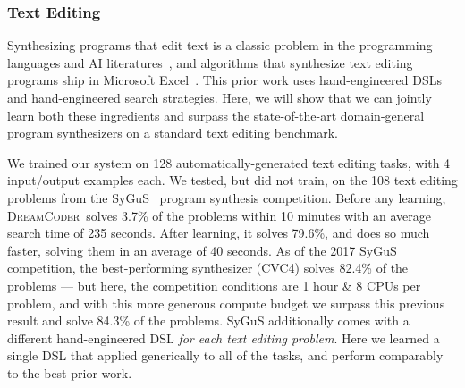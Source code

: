 \documentclass{article}
\newcommand{\system}{\textsc{DreamCoder}~}
\newcommand{\code}[1]{{\footnotesize\texttt{#1}}}
\newcommand{\probability}{\mathds{P}} %
\begin{document}
\subsubsection{Text Editing}\label{textSection}
Synthesizing programs that edit text is a classic problem in the
programming languages and AI literatures~\cite{lau2001programming},
and algorithms that synthesize text editing programs ship in Microsoft
Excel~\cite{gulwani2011automatin}.  This prior work uses
hand-engineered DSLs and hand-engineered search strategies.  Here, we
will show that we can jointly learn both these ingredients and surpass
the state-of-the-art domain-general program synthesizers on a standard
text editing benchmark.


We trained our system on 128 automatically-generated text editing tasks, with 4 input/output examples each.
We tested, but did not train, on the 108 text editing problems from the SyGuS~\cite{alur2016sygus} program synthesis competition. Before any learning,
\system solves 3.7\% of the problems within 10 minutes with an average search time of 235 seconds.
After learning,
it solves 79.6\%, and does so much faster,
solving them in an average of 40 seconds.
As of the 2017 SyGuS competition,
the best-performing synthesizer (CVC4) solves 82.4\% of the problems ---
but here, the competition conditions are 1 hour \& 8 CPUs per problem,
and with this more generous compute budget we
surpass
this previous
result and solve
84.3\% of the problems.
SyGuS additionally comes with a
different hand-engineered DSL \emph{for each text editing problem}. %
Here  we learned a single DSL
that applied generically to
all of the tasks,
and perform comparably to the best
prior work.
\end{document}
